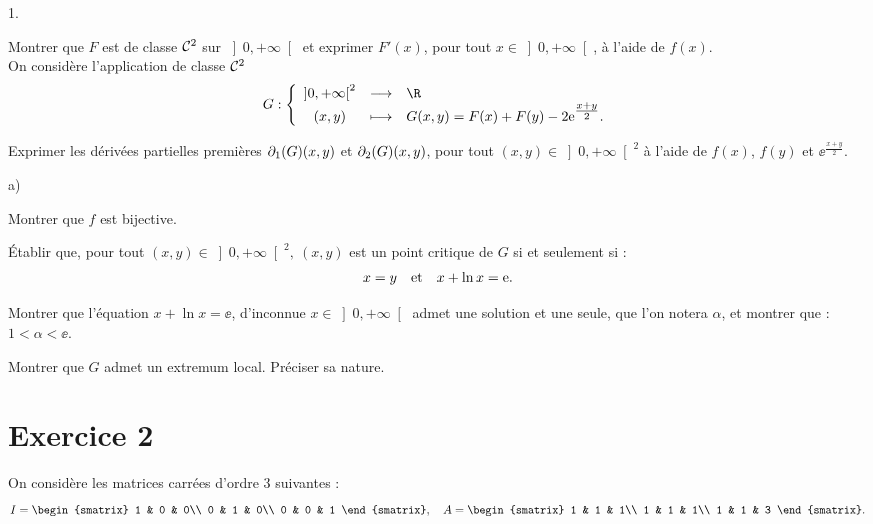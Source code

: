 \documentclass[11pt]{article}%
\begin{document}
\begin{noliste}{1.}
 \setlength{\itemsep}{4mm}
 \setcounter{enumi}{10}
\item Montrer que $F$ est de classe $\Cont{2}$ sur $\left] 0, + \infty
\right[$ et exprimer $F'( x) $, pour tout $x\in \left]
0, + \infty \right[ $, à l'aide de $f( x)$.\\
On considère l'application de classe $\Cont{2}$
\[
G :\left\{
\begin{array}{ccl}
\left] 0, + \infty \right[^{2} & \longrightarrow & \R
\\
(x,y) & \longmapsto & G(x,y) = F(x) + F(y)
-2\ee^{\tfrac{x + y}{2}}.
\end{array}
\right.
\]


\item Exprimer les dérivées partielles premières $\dfn{G}{1}(x,y)$ 
et $\dfn{G}{2}(x,y)$, pour tout
$( x,y) \in \left] 0, + \infty \right[^{2}$ à l'aide de
$f\left( x\right) $, $f\left( y\right) $ et $\ee^{\tfrac{x + y}{2}}.$

\item
\begin{noliste}{a)}
 \setlength{\itemsep}{2mm}
\item Montrer que $f$ est bijective.

\item Établir que, pour tout $( x,y) \in \left]
0, + \infty \right[^{2},\ (x,y) $ est un point critique de
$G$ si et seulement si :
\[
x = y\quad \text{et\quad}x + \ln x = \ee.
\]
\end{noliste}

\item Montrer que l'équation $x + \ln x = \ee$, d'inconnue $x\in \left]
0, + \infty \right[ $ admet une solution et une seule, que l'on notera
$\alpha$, et montrer que : $1<\alpha<\ee.$

\item Montrer que $G$ admet un extremum local. Préciser sa nature.
\end{noliste}

\newpage

\section*{Exercice 2}

\noindent
On considère les matrices carrées d'ordre 3 suivantes :
\[
I = 
\begin{smatrix}
1 & 0 & 0\\
0 & 1 & 0\\
0 & 0 & 1
\end{smatrix},\quad A = 
\begin{smatrix}
1 & 1 & 1\\
1 & 1 & 1\\
1 & 1 & 3
\end{smatrix}.
\]
\end{document}
